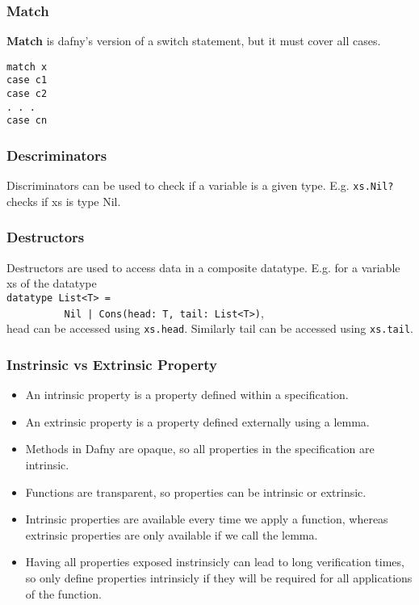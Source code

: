 \subsubsection{Match}

\textbf{Match} is dafny's version of a switch statement, but it must cover all cases.
\begin{verbatim}
match x
case c1
case c2
. . .
case cn
\end{verbatim}

\subsubsection{Descriminators}
Discriminators can be used to check if a variable is a given type. E.g. \verb!xs.Nil?! checks if xs is type Nil.

\subsubsection{Destructors}
Destructors are used to access data in a composite datatype. E.g. for a variable xs of the datatype\\
\verb!datatype List<T> =!\\
\verb!          Nil | Cons(head: T, tail: List<T>)!,\\
head can be accessed using \verb!xs.head!. Similarly tail can be accessed using \verb!xs.tail!.

\subsubsection{Instrinsic vs Extrinsic Property}
\begin{itemize}
        \item An intrinsic property is a property defined within a specification.
        \item An extrinsic property is a property defined externally using a lemma.
        \item Methods in Dafny are opaque, so all properties in the specification are intrinsic.
        \item Functions are transparent, so properties can be intrinsic or extrinsic.
        \item Intrinsic properties are available every time we apply a function, whereas extrinsic properties are only available if we call the lemma.
        \item Having all properties exposed instrinsicly can lead to long verification times, so only define properties intrinsicly if they will be required for all applications of the function.
\end{itemize}